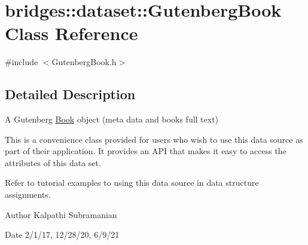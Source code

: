 \hypertarget{classbridges_1_1dataset_1_1_gutenberg_book}{}\section{bridges\+:\+:dataset\+:\+:Gutenberg\+Book Class Reference}
\label{classbridges_1_1dataset_1_1_gutenberg_book}


{\ttfamily \#include $<$Gutenberg\+Book.\+h$>$}



\subsection{Detailed Description}
A Gutenberg \hyperlink{classbridges_1_1dataset_1_1_book}{Book} object (meta data and book\textquotesingle{}s full text) 

This is a convenience class provided for users who wish to use this data source as part of their application. It provides an A\+PI that makes it easy to access the attributes of this data set.

Refer to tutorial examples to using this data source in data structure assignments.

\begin{DoxyAuthor}{Author}
Kalpathi Subramanian 
\end{DoxyAuthor}
\begin{DoxyDate}{Date}
2/1/17, 12/28/20, 6/9/21 
\end{DoxyDate}
